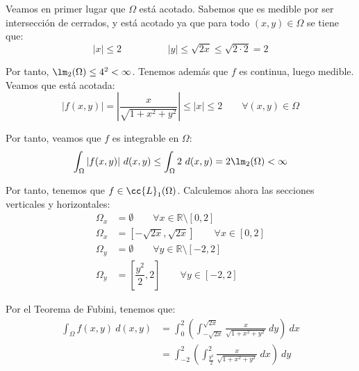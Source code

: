 \begin{ejercicio}
\begin{enumerate}
        Veamos en primer lugar que $\Omega$ está acotado. Sabemos que es medible por ser intersección de cerrados, y está acotado ya que
        para todo $(x, y) \in \Omega$ se tiene que:
        \begin{equation*}
            |x|\leq 2
            \hspace{2cm}
            |y|\leq \sqrt{2x} \leq \sqrt{2\cdot 2} = 2
        \end{equation*}

        Por tanto, $\lm_2(\Omega) \leq 4^2 < \infty$. Tenemos además que $f$ es continua, luego medible. Veamos que está acotada:
        \begin{equation*}
            |f(x,y)| = \left| \frac{x}{\sqrt{1 + x^2 + y^2}} \right| \leq |x| \leq 2
            \qquad \forall (x, y) \in \Omega
        \end{equation*}

        Por tanto, veamos que $f$ es integrable en $\Omega$:
        \begin{equation*}
            \int_{\Omega} |f(x, y)|~d(x, y) \leq \int_{\Omega} 2~d(x, y) = 2 \lm_2(\Omega) < \infty
        \end{equation*}

        Por tanto, tenemos que $f\in \cc{L}_1(\Omega)$. Calculemos ahora las secciones verticales y horizontales:
        \begin{align*}
            \Omega_x &= \emptyset \qquad \forall x \in \mathbb{R} \setminus [0, 2] \\
            \Omega_x &= \left[ -\sqrt{2x}, \sqrt{2x} \right] \qquad \forall x \in [0, 2] \\
            \Omega_y &= \emptyset \qquad \forall y \in \mathbb{R} \setminus [-2, 2] \\
            \Omega_y &= \left[ \dfrac{y^2}{2}, 2\right] \qquad \forall y \in [-2, 2]
        \end{align*}
        
        
        Por el Teorema de Fubini, tenemos que:
        \begin{align*}
            \int_{\Omega} f(x, y)~d(x, y)
            &= \int_{0}^{2} \left( \int_{-\sqrt{2x}}^{\sqrt{2x}} \frac{x}{\sqrt{1 + x^2 + y^2}}~dy \right)~dx\\
            &= \int_{-2}^{2} \left( \int_{\frac{y^2}{2}}^{2} \frac{x}{\sqrt{1 + x^2 + y^2}}~dx \right)~dy
        \end{align*}


\end{enumerate}
\end{ejercicio}
